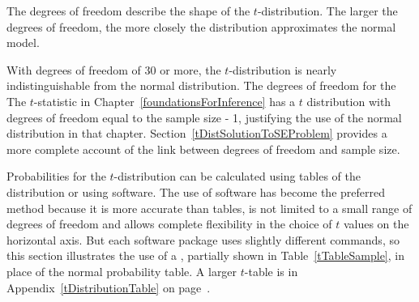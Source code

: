 \begin{termBox}{
The degrees of freedom describe the shape of the $t$-distribution. The larger the degrees of freedom, the more closely the distribution approximates the normal model.}
\end{termBox}

With degrees of freedom of 30 or more, the $t$-distribution is nearly indistinguishable from the normal distribution. The degrees of freedom for the The $t$-statistic in Chapter~\ref{foundationsForInference} has a $t$ distribution with degrees of freedom equal to the sample size - 1, justifying the use of the normal distribution in that chapter.  Section~\ref{tDistSolutionToSEProblem} provides a more complete account of the link between degrees of freedom and sample size.

Probabilities for the $t$-distribution can be calculated using tables of the distribution or using software.  The use of software has become the preferred method because it is more accurate than tables, is not limited to a small range of degrees of freedom and allows complete flexibility in the choice of $t$ values on the horizontal axis.  But each software package uses slightly different commands, so this section illustrates the use of a , partially shown in Table~\ref{tTableSample}, in place of the normal probability table. A larger $t$-table is in Appendix~\ref{tDistributionTable} on page~\pageref{tDistributionTable}.

